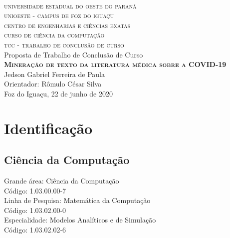 \documentclass[
	12pt,				%
	a4paper,			%
	english,			%
	brazil,				%
	]{article}
\begin{document}

\begin{center}

	\textsc{
		\large
			\\universidade estadual do oeste do paran\' a
			\\unioeste - campus de foz do igua\c cu
			\\centro de engenharias e ci\^ encias exatas
			\\curso de ci\^ encia da computa\c c\~ ao
			\\[1 cm]tcc - trabalho de conclus\~ ao de curso
	}
	\\
	[4 cm]
	\large Proposta de Trabalho de Conclus\~ ao de Curso
    \\
	\textbf{
	    \textsc{Minera\c c\~ ao de texto da literatura m\' edica sobre a COVID-19}
    }
	\\[5 cm]Jedson Gabriel Ferreira de Paula
    \\Orientador: Rômulo César Silva
    \\[2 cm]Foz do Igua\c cu, 22 de junho de 2020
    
    
\end{center}

\thispagestyle{empty}

\section{Identifica\c c\~ ao}
    
    \subsection{Ci\^ encia da Computa\c c\~ ao} 
    
    
        \noindent Grande \' area: Ci\^ encia da Computa\c c\~ ao
        \\C\' odigo: 1.03.00.00-7 
    	\\[1 cm]Linha de Pesquisa: Matem\' atica da Computa\c c\~ ao
    	\\C\' odigo: 1.03.02.00-0
    	\\[1 cm]Especialidade: Modelos Anal\' iticos e de Simula{\c c}\~ ao
    	\\C\' odigo: 1.03.02.02-6
    	
\end{document}
